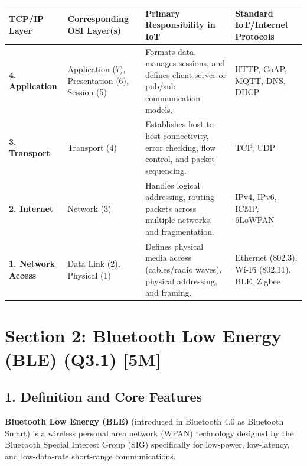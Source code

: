 \begin{table}[H]
\centering
\begin{tabular}{|p{}|p{}|p{}|p{}|}
\hline
TCP/IP Layer & Corresponding OSI Layer(s) & Primary Responsibility in IoT & Standard IoT/Internet Protocols \\
\hline
\textbf{4. Application} & Application (7), Presentation (6), Session (5) & Formats data, manages sessions, and defines client-server or pub/sub communication models. & HTTP, CoAP, MQTT, DNS, DHCP \\
\hline
\textbf{3. Transport} & Transport (4) & Establishes host-to-host connectivity, error checking, flow control, and packet sequencing. & TCP, UDP \\
\hline
\textbf{2. Internet} & Network (3) & Handles logical addressing, routing packets across multiple networks, and fragmentation. & IPv4, IPv6, ICMP, 6LoWPAN \\
\hline
\textbf{1. Network Access} & Data Link (2), Physical (1) & Defines physical media access (cables/radio waves), physical addressing, and framing. & Ethernet (802.3), Wi-Fi (802.11), BLE, Zigbee \\
\hline
\end{tabular}
\end{table}


\section{Section 2: Bluetooth Low Energy (BLE) (Q3.1) [5M]}

\subsection{1. Definition and Core Features}
\textbf{Bluetooth Low Energy (BLE)} (introduced in Bluetooth 4.0 as Bluetooth Smart) is a wireless personal area network (WPAN) technology designed by the Bluetooth Special Interest Group (SIG) specifically for low-power, low-latency, and low-data-rate short-range communications.

